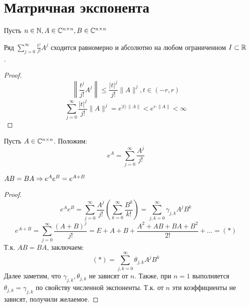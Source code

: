 

\section{Матричная экспонента}
Пусть \(n \in \mathbb{N}, A \in \mathbb{C}^{n \times n}, B \in \mathbb{C}^{n \times n}\)
\begin{lemma}
    Ряд \(\sum_{j = 0}^\infty \frac{t^j}{j!}A^j\) сходится равномерно и абсолютно на любом ограниченном \(I \subset \mathbb{R}\).
\end{lemma}
\begin{proof}
    \[\left\|\frac{t^j}{j!}A^j\right\| \le \frac{|t|^j}{j!}\|A\|^j, t \in (-r, r)\]
    \[\sum_{j = 0}^\infty \frac{|t|^j}{j!}\|A\|^j = e^{|t|\cdot\|A\|} < e^{r\cdot\|A\|} < \infty\]
\end{proof}

\begin{definition}
    Пусть \(A \in \mathbb{C}^{n \times n}\). Положим:
    \[e^A = \sum_{j = 0}^\infty \frac{A^j}{j!}\]
\end{definition}

\begin{proposition}
    \(AB = BA \Rightarrow e^Ae^B = e^{A + B}\)
\end{proposition}
\begin{proof}
    \[e^Ae^B = \sum_{j = 0}^\infty \frac{A^j}{j!}\left( \sum_{k = 0}^\infty \frac{B^k}{k!} \right) = \sum_{j, k = 0}^\infty \gamma_{j, k}A^jB^k\]
    \[e^{A + B} = \sum_{j = 0}^\infty \frac{(A + B)^j}{j!} = E + A + B + \frac{A^2 + AB + BA + B^2}{2!} + \dots = (*)\]
    Т.к. \(AB = BA\), заключаем:
    \[(*) = \sum_{j, k = 0}^\infty \theta_{j, k}A^jB^k\]
    Далее заметим, что \(\gamma_{j, k}, \theta_{j, k}\) не зависят от \(n\). Также, при \(n = 1\) выполняется \(\theta_{j, k} = \gamma_{j, k}\) по свойству численной экспоненты. Т.к. от \(n\) эти коэффициенты не зависят, получили желаемое.
\end{proof}

